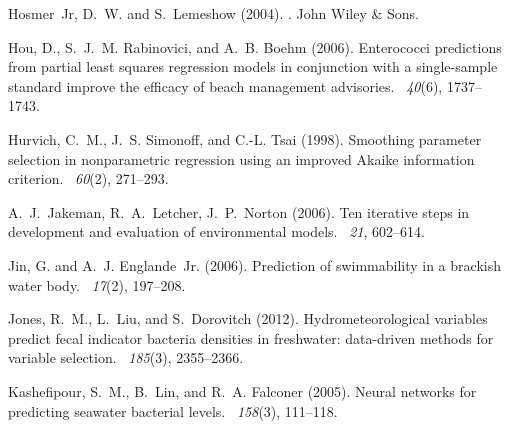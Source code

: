 \documentclass[authoryear,review, 12pt]{elsarticle}
\begin{document}
\begin{thebibliography}{}
Hosmer~Jr, D.~W. and S.~Lemeshow (2004).
.
\newblock John Wiley \& Sons.

Hou, D., S.~J.~M. Rabinovici, and A.~B. Boehm (2006).
\newblock Enterococci predictions from partial least squares regression models
  in conjunction with a single-sample standard improve the efficacy of beach
  management advisories.
~{\em 40\/}(6),
  1737--1743.

Hurvich, C.~M., J.~S. Simonoff, and C.-L. Tsai (1998).
\newblock Smoothing parameter selection in nonparametric regression using an
  improved {A}kaike information criterion.
~{\em 60\/}(2), 271--293.

A.~J.~Jakeman, R.~A.~Letcher, J.~P.~Norton (2006).
\newblock Ten iterative steps in development and evaluation of environmental models.
~{\em 21}, 602--614.

Jin, G. and A.~J. Englande~Jr. (2006).
\newblock Prediction of swimmability in a brackish water body.
~{\em 17\/}(2), 197--208.

Jones, R.~M., L.~Liu, and S.~Dorovitch (2012).
\newblock Hydrometeorological variables predict fecal indicator bacteria
  densities in freshwater: data-driven methods for variable selection.
~{\em 185\/}(3),
  2355--2366.

Kashefipour, S.~M., B.~Lin, and R.~A. Falconer (2005).
\newblock Neural networks for predicting seawater bacterial levels.
~{\em 158\/}(3), 111--118.


\end{thebibliography}
\end{document}
